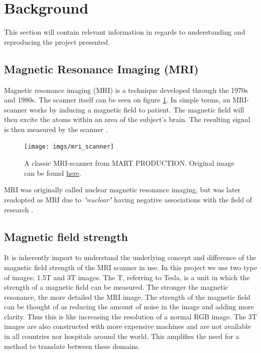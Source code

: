 \documentclass[12pt, fleqn, titlepage]{article}
\begin{document}
\section{Background}

This section will contain relevant information in regards to understanding and reproducing the project presented. 

\subsection{Magnetic Resonance Imaging (MRI)}
Magnetic resonance imaging (MRI) is a technique developed through the 1970s and 1980s. The scanner itself can be seen on figure \ref{fig:mriscanner}. In simple terms, an MRI-scanner works by inducing a magnetic field to patient. The magnetic field will then excite the atoms within an area of the subject's brain. The resulting signal is then measured by the scanner \cite{mri}.  
\begin{figure}[H]
	\centering
	\texttt{[image: imgs/mri\_scanner]}
	\caption{A classic MRI-scanner from MART PRODUCTION. Original image can be found \href{https://www.pexels.com/photo/technology-hospital-medicine-indoors-7089017/}{here}. }
	\label{fig:mriscanner}
\end{figure}

MRI was originally called nuclear magnetic resonance imaging, but was later readopted as MRI due to \textit{"nuclear"} having negative associations with the field of research \cite{wiki} \cite{mri2}.

\subsection{Magnetic field strength}
It is inherently import to understand the underlying concept and difference of the magnetic field strength of the MRI scanner in use. In this project we use two type of images: 1.5T and 3T images. The T, referring to Tesla, is a unit in which the strength of a magnetic field can be measured. The stronger the magnetic resonance, the more detailed the MRI image. The strength of the magnetic field can be thought of as reducing the amount of noise in the image and adding more clarity. Thus this is like increasing the resolution of a normal RGB image. The 3T images are also constructed with more expensive machines and are not available in all countries nor hospitals around the world. This amplifies the need for a method to translate between these domains. 
\end{document}
